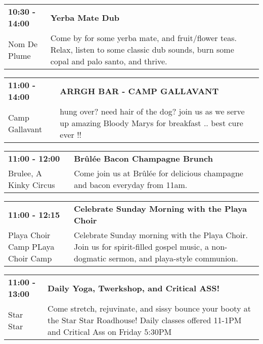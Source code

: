 \begin{tabular}{ p{1in} p{2.2in} }
    \textbf{10:30 - 14:00} & \textbf{Yerba Mate Dub} \\
    Nom De Plume \newline  & Come by for some yerba mate, and fruit/flower teas. Relax, listen to some classic dub sounds, burn some copal and palo santo, and thrive. \\
    \hline 
\end{tabular}
    
\begin{tabular}{ p{1in} p{2.2in} }
    \textbf{11:00 - 14:00} & \textbf{ARRGH BAR - CAMP GALLAVANT} \\
    Camp Gallavant \newline  & hung over? need hair of the dog?  join us as we serve up amazing Bloody Marys for breakfast .. best cure ever !! \\
    \hline 
\end{tabular}
    
\begin{tabular}{ p{1in} p{2.2in} }
    \textbf{11:00 - 12:00} & \textbf{Br\^ul\'ee Bacon Champagne Brunch} \\
    Brulee, A Kinky Circus \newline  & Come join us at Br\^ul\'ee for delicious champagne and bacon everyday from 11am. \\
    \hline 
\end{tabular}
    
\begin{tabular}{ p{1in} p{2.2in} }
    \textbf{11:00 - 12:15} & \textbf{Celebrate Sunday Morning with the Playa Choir} \\
    Playa Choir Camp \newline PLaya Choir Camp & Celebrate Sunday morning with the Playa Choir. Join us for spirit-filled gospel music, a non-dogmatic sermon, and playa-style communion. \\
    \hline 
\end{tabular}
    
\begin{tabular}{ p{1in} p{2.2in} }
    \textbf{11:00 - 13:00} & \textbf{Daily Yoga, Twerkshop, and Critical ASS!} \\
    Star Star \newline  & Come stretch, rejuvinate, and sissy bounce your booty at the Star Star Roadhouse! Daily classes offered 11-1PM and Critical Ass on Friday 5:30PM \\
    \hline 
\end{tabular}
    
